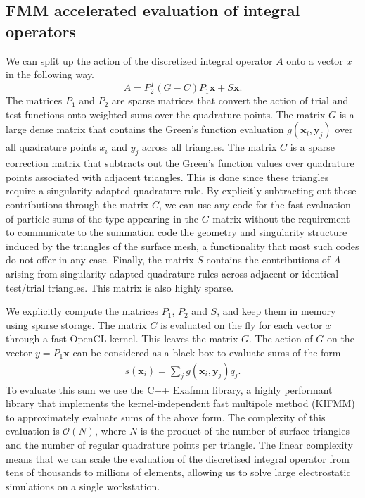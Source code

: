 \subsection{FMM accelerated evaluation of integral operators}
We can split up the action of the discretized integral operator $A$ onto a vector $x$ in the following way.
$$
A = P_2^T (G - C)P_1 \mathbf{x} + S \mathbf{x}.
$$
The matrices $P_1$ and $P_2$ are sparse matrices that convert the action of trial and test functions onto weighted sums over the quadrature points.
The matrix $G$ is a large dense matrix that contains the Green's function evaluation $g(\mathbf{x}_i, \mathbf{y}_j)$ over all quadrature points $x_i$ and $y_j$ across all triangles.
The matrix $C$ is a sparse correction matrix that subtracts out the Green's function values over quadrature points associated with  adjacent triangles.
This is done since these triangles require a singularity adapted quadrature rule.
By explicitly subtracting out these contributions through the matrix $C$, we can use any code for the fast evaluation of particle sums of the type appearing in the $G$ matrix without the requirement to communicate to the summation code the geometry and singularity structure induced by the triangles of the surface mesh, a functionality that most such codes do not offer in any case.
Finally, the matrix $S$ contains the contributions of $A$ arising from singularity adapted quadrature rules across adjacent or identical test/trial triangles.
This matrix is also highly sparse.

We explicitly compute the matrices $P_1$, $P_2$ and $S$, and keep them in memory using sparse storage.
The matrix $C$ is evaluated on the fly for each vector $x$ through a fast OpenCL kernel.
This leaves the matrix $G$.
The action of $G$ on the vector $y=P_1 \mathbf{x}$ can be considered as a black-box to evaluate sums of the form
%
\begin{align}\label{eq:nbody_sum}
s(\mathbf{x}_i) = \sum_j g(\mathbf{x}_i, \mathbf{y}_j)q_j.
\end{align}
%
To evaluate this sum we use the C++ Exafmm library, a highly performant library that implements the kernel-independent fast multipole method (KIFMM) to approximately evaluate sums of the above form.
The complexity of this evaluation is $\mathcal{O}(N)$, where $N$ is the product of the number of surface triangles and the number of regular quadrature points per triangle.
The linear complexity means that we can scale the evaluation of the discretised integral operator from tens of thousands to millions of elements, allowing us to solve large  electrostatic simulations on a single workstation.